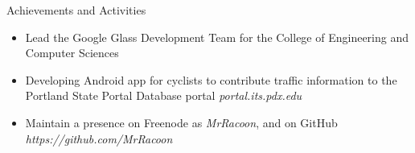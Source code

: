 \documentclass[11pt,oneside]{article}
\newenvironment{ressection}[1]{
	\vspace{4pt}
	{\fontfamily{phv}\selectfont\Large#1}
	\begin{itemize}
	\vspace{3pt}
}{
	\end{itemize}
}
\newcommand{\resitem}[1]{
	\vspace{-4pt}
	\item \begin{flushleft} #1 \end{flushleft}
}
\begin{document}
\begin{ressection}{Achievements and Activities}
    \resitem{Lead the Google Glass Development Team for the College of Engineering and Computer Sciences}
    \resitem{Developing Android app for cyclists to contribute traffic information to the Portland State Portal Database portal \textit{portal.its.pdx.edu}}
    \resitem{Maintain a presence on Freenode as \textit{MrRacoon}, and on GitHub \textit{https://github.com/MrRacoon}}
\end{ressection}
\end{document}
